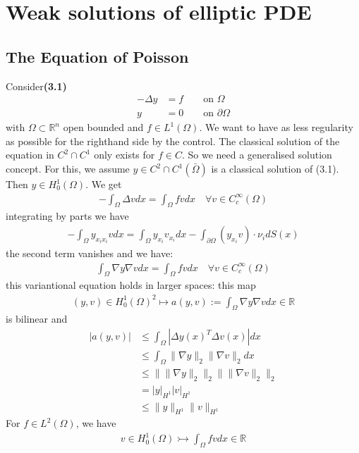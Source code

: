 \documentclass[a4paper,11pt,fleqn]{book}
\theoremstyle{definition}
\theoremstyle{remark}
\begin{document}
\section{Weak solutions of elliptic PDE}
\subsection{The Equation of Poisson}
Consider\textbf{(3.1)}
\begin{align*}
	-\Delta y &= f \qquad \text{on } \Omega\\
	y &= 0 \qquad \text{on } \partial \Omega
\end{align*}
with $\Omega \subset \mathbb{R}^n$ open bounded and $f \in L^1(\Omega)$. We want to have as less regularity as possible for the righthand side by the control. The classical solution of the equation in $C^2 \cap C^1$ only exists for $f \in C$. So we need a generalised solution concept. \quad
For this, we assume $y \in C^2 \cap C^1(\bar{\Omega})$ is a classical solution of (3.1). Then $y \in H^1_0(\Omega)$. We get 
\begin{align*}
	-\int_{\Omega} \Delta v dx = \int_\Omega fv dx\quad \forall v \in C_c^\infty(\Omega)
\end{align*}
integrating by parts we have
\begin{align*}
	-\int_{\Omega} y_{x_ix_i} v dx = \int_\Omega y_{x_i} v_{x_i} dx - \int_{\partial \Omega} (y_{x_i} v)\cdot \nu_i dS(x) 
\end{align*}
the second term vanishes and we have:
\begin{align*}
	\int_{\Omega} \nabla y \nabla v dx = \int_\Omega fv dx \quad \forall v \in C_c^\infty(\Omega)
\end{align*}
this variantional equation holds in larger spaces: this map
\begin{align*}
	(y, v) \in H^1_0(\Omega)^2 \mapsto a(y, v) := \int_{\Omega} \nabla y \nabla v dx \in \mathbb{R}
\end{align*}
is bilinear and 
\begin{align*}
	|a(y, v)| &\le \int_\Omega |\Delta y(x)^T \Delta v(x)|dx \\
	&\le \int_\Omega \|\nabla y\|_2 \|\nabla v\|_2 dx \\
	&\le \| \|\nabla y\|_2 \|_2 \| \|\nabla v\|_2 \|_2\\
	&= |y|_{H^1} |v|_{H^1}\\
	&\le \|y\|_{H^1} \|v\|_{H^1}
\end{align*}
For $f \in L^2(\Omega)$, we have
\begin{align*}
	v \in H_0^1(\Omega) \rightarrowtail \int_\Omega fv dx \in \mathbb{R}
\end{align*}
\end{document}
